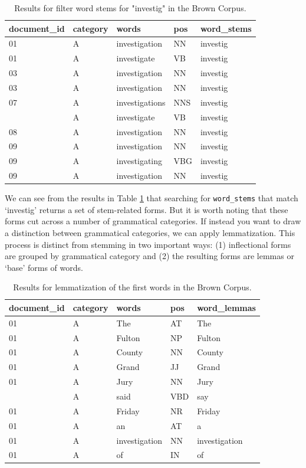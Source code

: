 \documentclass[
]{article}
\begin{document}
\begin{table}

\caption{\label{tab:recoding-stemming-brown-search}Results for filter word stems for "investig" in the Brown Corpus.}
\centering
\begin{tabular}[t]{lllll}
\toprule
document\_id & category & words & pos & word\_stems\\
\midrule
01 & A & investigation & NN & investig\\
01 & A & investigate & VB & investig\\
03 & A & investigation & NN & investig\\
03 & A & investigation & NN & investig\\
07 & A & investigations & NNS & investig\\
\addlinespace
07 & A & investigate & VB & investig\\
08 & A & investigation & NN & investig\\
09 & A & investigation & NN & investig\\
09 & A & investigating & VBG & investig\\
09 & A & investigation & NN & investig\\
\bottomrule
\end{tabular}
\end{table}

We can see from the results in Table \ref{tab:recoding-stemming-brown-search} that searching for \texttt{word\_stems} that match `investig' returns a set of stem-related forms. But it is worth noting that these forms cut across a number of grammatical categories. If instead you want to draw a distinction between grammatical categories, we can apply lemmatization. This process is distinct from stemming in two important ways: (1) inflectional forms are grouped by grammatical category and (2) the resulting forms are lemmas or `base' forms of words.

\begin{table}

\caption{\label{tab:recoding-lemmatization-brown-example}Results for lemmatization of the first words in the Brown Corpus.}
\centering
\begin{tabular}[t]{lllll}
\toprule
document\_id & category & words & pos & word\_lemmas\\
\midrule
01 & A & The & AT & The\\
01 & A & Fulton & NP & Fulton\\
01 & A & County & NN & County\\
01 & A & Grand & JJ & Grand\\
01 & A & Jury & NN & Jury\\
\addlinespace
01 & A & said & VBD & say\\
01 & A & Friday & NR & Friday\\
01 & A & an & AT & a\\
01 & A & investigation & NN & investigation\\
01 & A & of & IN & of\\
\bottomrule
\end{tabular}
\end{table}
\end{document}
